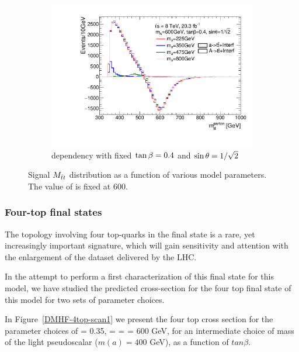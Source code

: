 \begin{figure}
\begin{subfigure}[b]{0.49\textwidth}
\includegraphics[width=\textwidth]{texinputs/04_grid/figures/ttres/ttres_2HDMa_A_ma.pdf}
\caption{\ma dependency with fixed $\tan\beta=0.4$ and $\sin\theta=1/\sqrt{2}$}
\end{subfigure}
\caption{Signal $M_{\bar{t}t}$ distribution as a function of various model parameters. The value of \mA is fixed at 600\GeV.}
\label{fig:ttres_2HDM_A}
\end{figure}
\FloatBarrier

\subsubsection{Four-top final states}

The topology involving four top-quarks in the final state is a rare, yet increasingly important signature, which will gain sensitivity and attention with the enlargement of the dataset delivered by the LHC.  

In the attempt to perform a first characterization of this final state for this model, we have studied the predicted cross-section for the four top final state of this model for two sets of parameter choices. 

In Figure~\ref{DMHF-4top-scan1} we present the four top cross section for the parameter choices of \sinp = 0.35, \mA = \mH = \mHc = 600 GeV, for an intermediate choice of mass of the light pseudoscalar ($m(a) = 400$ GeV), as a function of $tan\beta$. 

